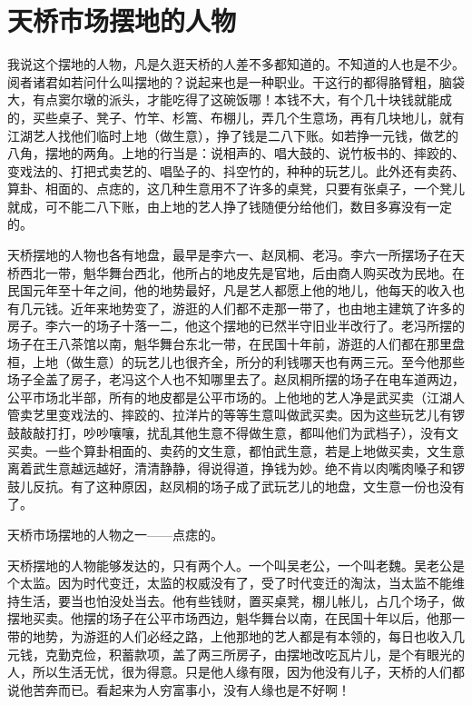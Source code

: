 \documentclass[12pt,UTF8]{ctexbook}
\begin{document}
\section{天桥市场摆地的人物}


我说这个摆地的人物，凡是久逛天桥的人差不多都知道的。不知道的人也是不少。阅者诸君如若问什么叫摆地的？说起来也是一种职业。干这行的都得胳臂粗，脑袋大，有点窦尔墩的派头，才能吃得了这碗饭哪！本钱不大，有个几十块钱就能成的，买些桌子、凳子、竹竿、杉篙、布棚儿，弄几个生意场，再有几块地儿，就有江湖艺人找他们临时上地（做生意），挣了钱是二八下账。如若挣一元钱，做艺的八角，摆地的两角。上地的行当是：说相声的、唱大鼓的、说竹板书的、摔跤的、变戏法的、打把式卖艺的、唱坠子的、抖空竹的，种种的玩艺儿。此外还有卖药、算卦、相面的、点痣的，这几种生意用不了许多的桌凳，只要有张桌子，一个凳儿就成，可不能二八下账，由上地的艺人挣了钱随便分给他们，数目多寡没有一定的。

天桥摆地的人物也各有地盘，最早是李六一、赵凤桐、老冯。李六一所摆场子在天桥西北一带，魁华舞台西北，他所占的地皮先是官地，后由商人购买改为民地。在民国元年至十年之间，他的地势最好，凡是艺人都愿上他的地儿，他每天的收入也有几元钱。近年来地势变了，游逛的人们都不走那一带了，也由地主建筑了许多的房子。李六一的场子十落一二，他这个摆地的已然半守旧业半改行了。老冯所摆的场子在王八茶馆以南，魁华舞台东北一带，在民国十年前，游逛的人们都在那里盘桓，上地（做生意）的玩艺儿也很齐全，所分的利钱哪天也有两三元。至今他那些场子全盖了房子，老冯这个人也不知哪里去了。赵凤桐所摆的场子在电车道两边，公平市场北半部，所有的地皮都是公平市场的。上他地的艺人净是武买卖（江湖人管卖艺里变戏法的、摔跤的、拉洋片的等等生意叫做武买卖。因为这些玩艺儿有锣鼓敲敲打打，吵吵嚷嚷，扰乱其他生意不得做生意，都叫他们为武档子），没有文买卖。一些个算卦相面的、卖药的文生意，都怕武生意，若是上地做买卖，文生意离着武生意越远越好，清清静静，得说得道，挣钱为妙。绝不肯以肉嘴肉嗓子和锣鼓儿反抗。有了这种原因，赵凤桐的场子成了武玩艺儿的地盘，文生意一份也没有了。

天桥市场摆地的人物之一——点痣的。



天桥摆地的人物能够发达的，只有两个人。一个叫吴老公，一个叫老魏。吴老公是个太监。因为时代变迁，太监的权威没有了，受了时代变迁的淘汰，当太监不能维持生活，要当也怕没处当去。他有些钱财，置买桌凳，棚儿帐儿，占几个场子，做摆地买卖。他摆的场子在公平市场西边，魁华舞台以南，在民国十年以后，他那一带的地势，为游逛的人们必经之路，上他那地的艺人都是有本领的，每日也收入几元钱，克勤克俭，积蓄款项，盖了两三所房子，由摆地改吃瓦片儿，是个有眼光的人，所以生活无忧，很为得意。只是他人缘有限，因为他没有儿子，天桥的人们都说他苦奔而已。看起来为人穷富事小，没有人缘也是不好啊！
\end{document}

